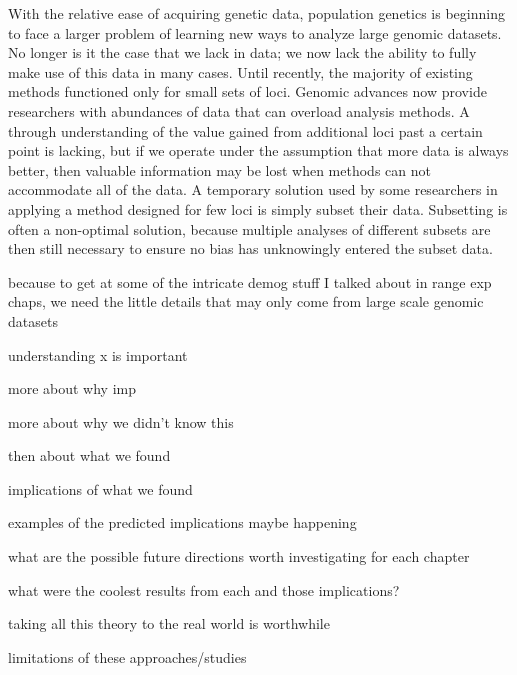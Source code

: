 With the relative ease of acquiring genetic data, population genetics is beginning to face a larger problem of learning new ways to analyze large genomic datasets. No longer is it the case that we lack in data; we now lack the ability to fully make use of this data in many cases. Until recently, the majority of existing methods functioned only for small sets of loci. Genomic advances now provide researchers with abundances of data that can overload analysis methods. A through understanding of the value gained from additional loci past a certain point is lacking, but if we operate under the assumption that more data is always better, then valuable information may be lost when methods can not accommodate all of the data. A temporary solution used by some researchers in applying a method designed for few loci is simply subset their data. Subsetting is often a non-optimal solution, because multiple analyses of different subsets are then still necessary to ensure no bias has unknowingly entered the subset data. 

because to get at some of the intricate demog stuff I talked about in range exp chaps, we need the little details that may only come from large scale genomic datasets


understanding x is important

more about why imp

more about why we didn't know this

then about what we found

implications of what we found

examples of the predicted implications maybe happening

what are the possible future directions worth investigating for each chapter

what were the coolest results from each and those implications?

taking all this theory to the real world is worthwhile


limitations of these approaches/studies